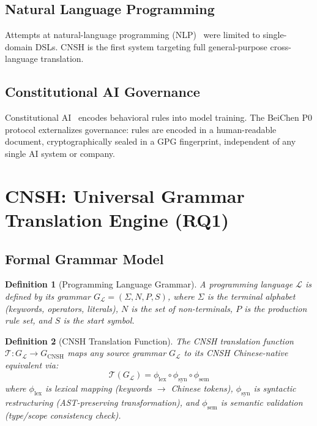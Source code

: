 \documentclass[conference]{IEEEtran}
\newtheorem{definition}{Definition}
\begin{document}
\subsection{Natural Language Programming}
Attempts at natural-language programming (NLP)~\cite{Knoll2006,
Mihalcea2006} were limited to single-domain DSLs.
CNSH is the first system targeting full general-purpose
cross-language translation.

\subsection{Constitutional AI Governance}
Constitutional AI~\cite{Bai2022} encodes behavioral rules into
model training.
The BeiChen P0 protocol externalizes governance: rules are
encoded in a human-readable document, cryptographically
sealed in a GPG fingerprint, independent of any single
AI system or company.

\section{CNSH: Universal Grammar Translation Engine (RQ1)}

\subsection{Formal Grammar Model}

\begin{definition}[Programming Language Grammar]
A programming language $\mathcal{L}$ is defined by its grammar
$G_{\mathcal{L}} = (\Sigma, N, P, S)$, where $\Sigma$ is the
terminal alphabet (keywords, operators, literals), $N$ is the
set of non-terminals, $P$ is the production rule set, and
$S$ is the start symbol.
\end{definition}

\begin{definition}[CNSH Translation Function]
The CNSH translation function
$\mathcal{T}: G_{\mathcal{L}} \to G_{\text{CNSH}}$
maps any source grammar $G_{\mathcal{L}}$ to its CNSH
Chinese-native equivalent via:
\begin{equation}
  \mathcal{T}(G_{\mathcal{L}}) =
  \phi_{\text{lex}} \circ \phi_{\text{syn}} \circ \phi_{\text{sem}}
  \label{eq:translation}
\end{equation}
where $\phi_{\text{lex}}$ is lexical mapping
(keywords $\to$ Chinese tokens),
$\phi_{\text{syn}}$ is syntactic restructuring
(AST-preserving transformation), and
$\phi_{\text{sem}}$ is semantic validation
(type/scope consistency check).
\end{definition}
\end{document}
